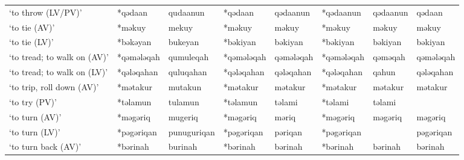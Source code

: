 \begin{landscape}
\begin{longtable}[c]{@{}p{3cm}<{\raggedright}p{2.75cm}<{\raggedright}p{2.75cm}<{\raggedright}p{2.75cm}<{\raggedright}p{2.75cm}<{\raggedright}p{2.75cm}<{\raggedright}p{2.75cm}<{\raggedright}p{2.75cm}<{\raggedright}@{}}
`to throw (LV/PV)'                                   & *qədaan      & qudaanun                      & *qədaan        & qədaanun                   & *qədaanun        & qədaanun                 & qədaan                            \\
`to tie (AV)'                                        & *məkuy       & mekuy                         & *məkuy         & məkuy                      & *məkuy           & məkuy                    & məkuy                             \\
`to tie (LV)'                                        & *bəkəyan     & bukeyan                       & *bəkiyan       & bəkiyan                    & *bəkiyan         & bəkiyan                  & bəkiyan                           \\
`to tread; to walk on (AV)'                          & *qəmələqah   & qumuleqah                     & *qəmələqah     & qəmələqah                  & *qəmələqah       & qəməqah                  & qəmələqah                         \\
`to tread; to walk on (LV)'                          & *qələqahan   & quluqahan                     & *qələqahan     & qələqahan                  & *qələqahan       & qahun                    & qələqahan                         \\
`to trip, roll down (AV)'                            & *mətakur     & mutakun                       & *mətakur       & mətakur                    & *mətakur         & mətakur                  & mətakur                           \\
`to try (PV)'                                        & *təlamun     & tulamun                       & *təlamun       & təlami                     & *təlami          & təlami                   &                                   \\
`to turn (AV)'                                       & *məgəriq     & mugeriq                       & *məgəriq       & məriq                      & *məgəriq         & məgəriq                  & məgəriq                           \\
`to turn (LV)'                                       & *pəgəriqan   & punuguriqan                   & *pəgəriqan     & pəriqan                    & *pəgəriqan       &                          & pəgəriqan                         \\
`to turn back (AV)'                                  & *bərinah     & burinah                       & *bərinah       & bərinah                    & *bərinah         & bərinah                  & bərinah                           \\

\end{longtable}
\end{landscape}

